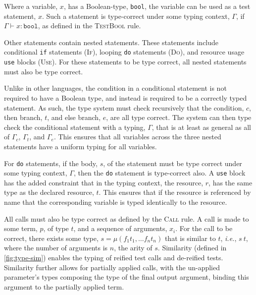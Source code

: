 Where a variable, $x$, has a Boolean-type, \texttt{bool}, the variable can be used as a test statement, $x$. Such a statement is type-correct under some typing context, $\Gamma$, if $\Gamma\vdash x:\mathtt{bool}$, as defined in the \textsc{TestBool} rule. 

Other statements contain nested statements. These statements include conditional \texttt{if} statements (\textsc{If}), looping \texttt{do} statements (\textsc{Do}), and resource usage \texttt{use} blocks (\textsc{Use}). For these statements to be type correct, all nested statements must also be type correct.

Unlike in other languages, the condition in a conditional statement is not required to have a Boolean type, and instead is required to be a correctly typed statement. As such, the type system must check recursively that the condition, $c$, then branch, $t$, and else branch, $e$, are all type correct. The system can then type check the conditional statement with a typing, $\Gamma$, that is at least as general as all of $\Gamma_c$, $\Gamma_t$, and $\Gamma_e$. This ensures that all variables across the three nested statements have a uniform typing for all variables.

For \texttt{do} statements, if the body, $s$, of the statement must be type correct under some typing context, $\Gamma$, then the \texttt{do} statement is type-correct also. A \texttt{use} block has the added constraint that in the typing context, the resource, $r$, has the same type as the declared resource, $t$. This ensures that if the resource is referenced by name that the corresponding variable is typed identically to the resource. 

All calls must also be type correct as defined by the \textsc{Call} rule. A call is made to some term, $p$, of type $t$, and a sequence of arguments, $x_i$. For the call to be correct, there exists some type, $s = \mu(f_1t_1,\dots f_nt_n)$ that is similar to $t$, \textit{i.e.}, $s ~ t$, where the number of arguments is $n$, the arity of $s$. Similarity (defined in \cref{fig:type-sim}) enables the typing of reified test calls and de-reified tests. Similarity further allows for partially applied calls, with the un-applied parameter's types composing the type of the final output argument, binding this argument to the partially applied term.

